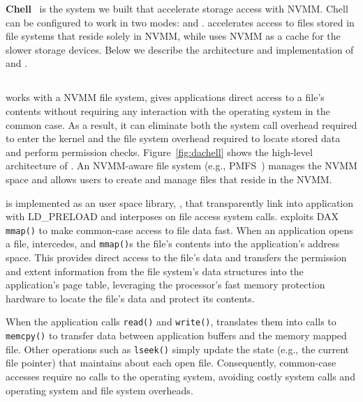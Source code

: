 \textbf{Chell}~\cite{Chell} is the system we built that accelerate storage
access with NVMM. Chell can be configured to work in two modes: \DAChell{}
and \CChell{}. \DAChell{} accelerates access to files stored in file systems
that reside solely in NVMM, while \CChell{} uses NVMM as a cache for the
slower storage devices. Below we describe the architecture and implementation
of \DAChell{} and \CChell{}.

\subsection{\DAChell{}}



\DAChell{} works with a NVMM file system, gives applications direct access to
a file's contents without
requiring any interaction with the operating system in the common case.  As a
result, it can eliminate both the system call overhead required to enter the
kernel and the file system overhead required to locate stored data and perform
permission checks.
Figure~\ref{fig:dachell} shows the high-level architecture of
\DAChell{}. An NVMM-aware file system (e.g.,
PMFS~\cite{PMFS}) manages the NVMM space and allows users to create and manage
files that reside in the NVMM.

\DAChell{} is implemented as an user space library, \libd{}, that transparently 
link into application with LD\_PRELOAD and interposes on file access system
calls.
\DAChell{} exploits DAX \texttt{mmap()} to make common-case access to file data
fast.  When an application opens a file, \DAChell{} intercedes, and
\texttt{mmap()}s the file's contents into the application's address space.
This provides direct access to the file's data and transfers the permission and
extent information from the file system's data structures into the
application's page table, leveraging the processor's fast memory
protection hardware to locate the file's data and protect its contents.

When the application calls \texttt{read()} and \texttt{write()}, \DAChell{}
translates them into calls to \texttt{memcpy()} to transfer data between
application buffers and the memory mapped file.  Other operations such as
\texttt{lseek()} simply update the state (e.g., the current file pointer) that
\DAChell{} maintains about each open file.  Consequently, common-case accesses
require no calls to the operating system, avoiding costly system calls and 
operating system and file system overheads.

